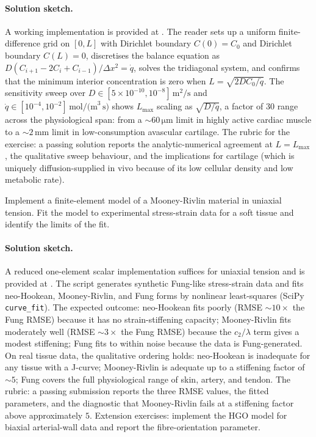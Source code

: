 \paragraph{Solution sketch.} A working implementation is provided
at . The reader sets up a
uniform finite-difference grid on $[0, L]$ with Dirichlet boundary
$C(0) = C_0$ and Dirichlet boundary $C(L) = 0$, discretises the
balance equation as
$D (C_{i+1} - 2 C_i + C_{i-1})/\Delta x^2 = \dot{q}$, solves the
tridiagonal system, and confirms that the minimum interior
concentration is zero when $L = \sqrt{2 D C_0 / \dot{q}}$. The
sensitivity sweep over $D \in [5 \times 10^{-10}, 10^{-8}]\,\text{m}^2/\text{s}$
and $\dot{q} \in [10^{-4}, 10^{-2}]\,\text{mol/(m}^3\,\text{s)}$
shows $L_{\max}$ scaling as $\sqrt{D/\dot{q}}$, a factor of $30$
range across the physiological span: from a $\sim 60\,\si{\micro\meter}$
limit in highly active cardiac muscle to a $\sim 2\,\text{mm}$
limit in low-consumption avascular cartilage. The rubric for the
exercise: a passing solution reports the analytic-numerical
agreement at $L = L_{\max}$, the qualitative sweep behaviour, and
the implications for cartilage (which is uniquely diffusion-supplied
in vivo because of its low cellular density and low metabolic
rate).

\begin{exercise}
Implement a finite-element model of a Mooney-Rivlin material in
uniaxial tension. Fit the model to experimental stress-strain data
for a soft tissue and identify the limits of the fit.
\end{exercise}

\paragraph{Solution sketch.} A reduced one-element scalar
implementation suffices for uniaxial tension and is provided at
. The script generates
synthetic Fung-like stress-strain data and fits neo-Hookean,
Mooney-Rivlin, and Fung forms by nonlinear least-squares (SciPy
\verb|curve_fit|). The expected outcome: neo-Hookean fits poorly
(RMSE $\sim 10\times$ the Fung RMSE) because it has no
strain-stiffening capacity; Mooney-Rivlin fits moderately well
(RMSE $\sim 3\times$ the Fung RMSE) because the $c_2/\lambda$
term gives a modest stiffening; Fung fits to within noise because
the data is Fung-generated. On real tissue data, the qualitative
ordering holds: neo-Hookean is inadequate for any tissue with a
J-curve; Mooney-Rivlin is adequate up to a stiffening factor of
$\sim 5$; Fung covers the full physiological range of skin, artery,
and tendon. The rubric: a passing submission reports the three RMSE
values, the fitted parameters, and the diagnostic that Mooney-Rivlin
fails at a stiffening factor above approximately $5$. Extension
exercises: implement the HGO model
\cite{paper:v6c05-holzapfel-hgo-2000} for biaxial arterial-wall
data and report the fibre-orientation parameter.

